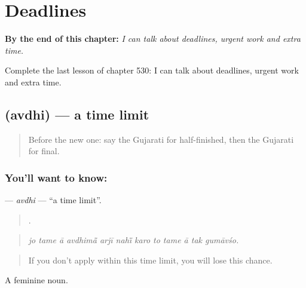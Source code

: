 
\chapter{Deadlines}
\label{ch:gu-deadlines}

\begin{chapteropening}
\textbf{By the end of this chapter:} \emph{I can talk about deadlines, urgent work and extra time.}

Complete the last lesson of chapter 530: I can talk about deadlines, urgent work and extra time.
\end{chapteropening}

\section[\texorpdfstring{\gu{અવધિ} (avdhi)}{અવધિ (avdhi)}]{ (avdhi) — a time limit}

\label{lesson:GU-C530-avdhi}



\begin{quote}
Before the new one: say the Gujarati for half-finished, then the Gujarati for final.
\end{quote}

\subsection*{You'll want to know: }
\textbf{} — \emph{avdhi} — \textquotedblleft{}a time limit\textquotedblright{}.

\begin{quote}
           .
\end{quote}

\begin{quote}
\emph{jo tame ā avdhimā̃ arjī nahī̃ karo to tame ā tak gumāvśo.}
\end{quote}

\begin{quote}
If you don't apply within this time limit, you will lose this chance.
\end{quote}

A feminine noun.

